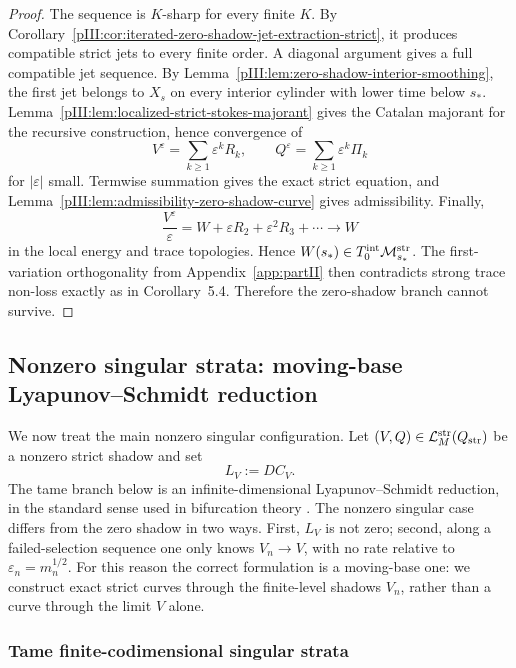 \documentclass[11pt]{article}
\numberwithin{equation}{section}
\theoremstyle{plain}
\theoremstyle{definition}
\theoremstyle{remark}
\newcommand{\Mstr}{\mathcal M^{\rm str}}
\newcommand{\Lstr}{\mathcal L^{\rm str}}
\newcommand{\Tint}{T^{\rm int}}
\begin{document}
\begin{proof}
The sequence is \(K\)-sharp for every finite \(K\).  By
Corollary~\ref{pIII:cor:iterated-zero-shadow-jet-extraction-strict}, it produces compatible strict jets to
every finite order.  A diagonal argument gives a full compatible jet sequence.  By
Lemma~\ref{pIII:lem:zero-shadow-interior-smoothing}, the first jet belongs to \(X_s\) on every interior
cylinder with lower time below \(s_*\).  Lemma~\ref{pIII:lem:localized-strict-stokes-majorant} gives the
Catalan majorant for the recursive construction, hence convergence of
\[
        V^\varepsilon=\sum_{k\ge1}\varepsilon^kR_k,
        \qquad
        Q^\varepsilon=\sum_{k\ge1}\varepsilon^k\Pi_k
\]
for \(|\varepsilon|\) small.  Termwise summation gives the exact strict equation, and
Lemma~\ref{pIII:lem:admissibility-zero-shadow-curve} gives admissibility.  Finally,
\[
        \frac{V^\varepsilon}{\varepsilon}=W+\varepsilon R_2+\varepsilon^2R_3+\cdots\to W
\]
in the local energy and trace topologies.  Hence \(W(s_*)\in\Tint_0\Mstr_{s_*}\).  The first-variation
orthogonality from Appendix~\ref{app:partII} then contradicts strong trace non-loss exactly as in
Corollary~5.4.  Therefore the zero-shadow branch cannot survive.
\end{proof}


\subsection{Nonzero singular strata: moving-base Lyapunov--Schmidt reduction}
\label{pIII:sec:general-singular}

We now treat the main nonzero singular configuration.  Let \((V,Q)\in\Lstr_M(Q_{\rm str})\) be a
nonzero strict shadow and set
\[
        L_V:=DC_V.
\]
The tame branch below is an infinite-dimensional Lyapunov--Schmidt reduction, in the standard sense used in bifurcation theory \cite{Kielhofer2012}.
The nonzero singular case differs from the zero shadow in two ways.  First, \(L_V\) is not zero;
second, along a failed-selection sequence one only knows \(V_n\to V\), with no rate relative to
\(\varepsilon_n=m_n^{1/2}\).  For this reason the correct formulation is a moving-base one: we
construct exact strict curves through the finite-level shadows \(V_n\), rather than a curve through the
limit \(V\) alone.

\subsubsection{Tame finite-codimensional singular strata}
\end{document}
